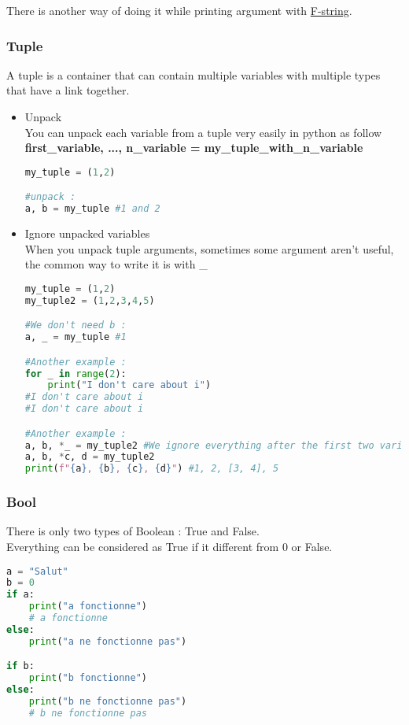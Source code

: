 \documentclass[a4paper, 12pt, titlepage]{scrartcl} %
\begin{document}
There is another way of doing it while printing argument with \hyperref[subsec:F-string]{F-string}.

\subsubsection{Tuple}
A tuple is a container that can contain multiple variables with multiple types that have a link together. \\
\begin{itemize}
\item Unpack \\
You can unpack each variable from a tuple very easily in python as follow \textbf{first\_variable, ..., n\_variable = my\_tuple\_with\_n\_variable}
\begin{lstlisting}[language=Python]
my_tuple = (1,2)

#unpack :
a, b = my_tuple #1 and 2
\end{lstlisting}

\item Ignore unpacked variables \\
When you unpack tuple arguments, sometimes some argument aren't useful, the common way to write it is with \_
\begin{lstlisting}[language=Python]
my_tuple = (1,2)
my_tuple2 = (1,2,3,4,5)

#We don't need b :
a, _ = my_tuple #1

#Another example :
for _ in range(2):
	print("I don't care about i")
#I don't care about i
#I don't care about i

#Another example :
a, b, *_ = my_tuple2 #We ignore everything after the first two variables, the rest is stored in a list.
a, b, *c, d = my_tuple2 
print(f"{a}, {b}, {c}, {d}") #1, 2, [3, 4], 5
\end{lstlisting}
\end{itemize}


\subsubsection{Bool}
\label{subsec:Bool}
There is only two types of Boolean : True and False. \\
Everything can be considered as True if it different from 0 or False. \\
\begin{lstlisting}[language=Python]
a = "Salut"
b = 0
if a:
	print("a fonctionne")
	# a fonctionne
else:
	print("a ne fonctionne pas")

if b:
	print("b fonctionne")
else:
	print("b ne fonctionne pas")
	# b ne fonctionne pas
\end{lstlisting}
\end{document}
